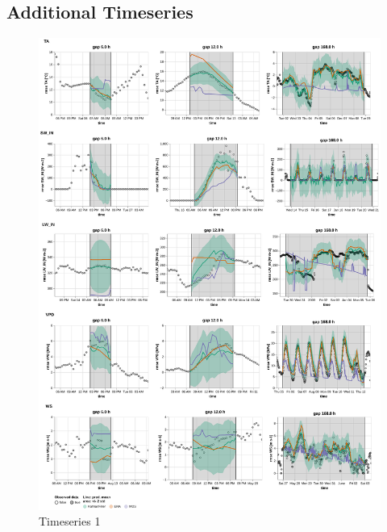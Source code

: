 \documentclass{article}
\newcommand{\imgwidth}{6in}
\let\Oldsubsection\subsection
\renewcommand{\subsection}{\FloatBarrier\Oldsubsection}
\begin{document}




\subsection{Additional Timeseries}

\begin{figure}
\centerline{\includegraphics[width=\imgwidth]{timeseries_1_1}}
\caption{Timeseries 1}
\label{fig:ts_1_1}
\end{figure}
\end{document}

